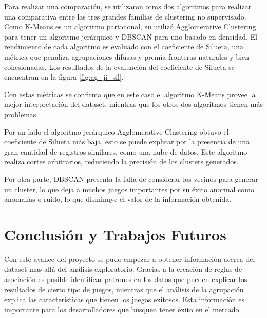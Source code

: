 \documentclass[conference]{IEEEtran}
\begin{document}
Para realizar una comparación, se utilizaron otros dos algoritmos para realizar una comparativa entre las tres grandes familias de clustering no supervisado. Como K-Means es un algoritmo particional, su utilizó Agglomerative Clustering para tener un algoritmo jerárquico y DBSCAN para uno basado en densidad. El rendimiento de cada algoritmo es evaluado con el coeficiente de Silueta, una métrica que penaliza agrupaciones difusas y premia fronteras naturales y bien cohesionadas. Los resultados de la evaluación del coeficiente de Silueta se encuentran en la figura \ref{fig:ag_ji_sil}.

Con estas métricas se confirma que en este caso el algoritmo K-Means provee la mejor interpretación del dataset, mientras que los otros dos algoritmos tienen más problemas.

Por un lado el algoritmo jerárquico Agglomerative Clustering obtuvo el coeficiente de Silueta más baja, esto se puede explicar por la presencia de una gran cantidad de registros similares, como una nube de datos. Este algoritmo realiza cortes arbitrarios, reduciendo la precisión de los clusters generados.

Por otra parte, DBSCAN presenta la falla de considerar los vecinos para generar un cluster, lo que deja a muchos juegos importantes por su éxito anormal como anomalías o ruido, lo que disminuye el valor de la información obtenida.

\section{Conclusión y Trabajos Futuros}
Con este avance del proyecto se pudo empezar a obtener información acerca del dataset mas allá del análisis exploratorio. Gracias a la creación de reglas de asociación es posible identificar patrones en los datos que pueden explicar los resultados de cierto tipo de juegos, mientras que el análisis de la agrupación explica las características que tienen los juegos exitosos. Esta información es importante para los desarrolladores que busquen tener éxito en el mercado.


\nocite{*}


\end{document}
